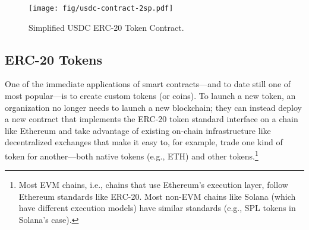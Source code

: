 




\begin{figure}[t]
    \centering
    \texttt{[image: fig/usdc-contract-2sp.pdf]}
    \caption{Simplified USDC ERC-20 Token Contract.}
    \label{fig:erc20}
\end{figure}


    




\subsection{ERC-20 Tokens}
One of the immediate applications of smart contracts---and to date still one of
most popular---is to create custom tokens (or coins).  To launch a new token, an
organization no longer needs to launch a new blockchain; they can instead deploy
a new contract that implements the ERC-20 token standard interface on a chain
like Ethereum and take advantage of existing on-chain infrastructure like
decentralized exchanges that make it easy to, for example, trade one kind of
token for another---both native tokens (e.g., ETH) and other tokens.\footnote{
    Most EVM chains, i.e., chains that use Ethereum's execution layer,
    follow Ethereum standards like ERC-20. Most non-EVM chains like Solana
    (which have different execution models) have similar standards (e.g., SPL
    tokens in Solana's case).
}

